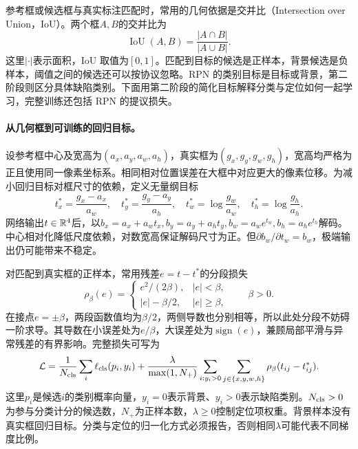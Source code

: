 参考框或候选框与真实标注匹配时，常用的几何依据是交并比（Intersection over Union，IoU）。两个框$A,B$的交并比为
\begin{equation}
 \operatorname{IoU}(A,B)=\frac{|A\cap B|}{|A\cup B|}.
\end{equation}
这里$|\cdot|$表示面积，IoU 取值为$[0,1]$。匹配到目标的候选是正样本，背景候选是负样本，阈值之间的候选还可以按协议忽略。RPN 的类别目标是目标或背景，第二阶段则区分具体缺陷类别。下面用第二阶段的简化目标解释分类与定位如何一起学习，完整训练还包括 RPN 的提议损失。

\paragraph{从几何框到可训练的回归目标。}
设参考框中心及宽高为$(a_x,a_y,a_w,a_h)$，真实框为$(g_x,g_y,g_w,g_h)$，宽高均严格为正且使用同一像素坐标系。相同相对位置误差在大框中对应更大的像素位移。为减小回归目标对框尺寸的依赖，定义无量纲目标
\begin{equation}
 t_x^*=\frac{g_x-a_x}{a_w},\quad t_y^*=\frac{g_y-a_y}{a_h},\quad
 t_w^*=\log\frac{g_w}{a_w},\quad t_h^*=\log\frac{g_h}{a_h}.
\end{equation}
网络输出$t\in\mathbb{R}^4$后，以$b_x=a_x+a_wt_x,b_y=a_y+a_ht_y,b_w=a_we^{t_w},b_h=a_he^{t_h}$解码。中心相对化降低尺度依赖，对数宽高保证解码尺寸为正。但$\partial b_w/\partial t_w=b_w$，极端输出仍可能带来不稳定。

对匹配到真实框的正样本，常用残差$e=t-t^*$的分段损失
\begin{equation}
 \rho_\beta(e)=\begin{cases}e^2/(2\beta),&|e|<\beta,\\|e|-\beta/2,&|e|\geq\beta,\end{cases}
 \qquad \beta>0.
\end{equation}
在接点$e=\pm\beta$，两段函数值均为$\beta/2$，两侧导数也分别相等，所以此处分段不妨碍一阶求导。其导数在小误差处为$e/\beta$，大误差处为$\operatorname{sign}(e)$，兼顾局部平滑与异常残差的有界影响。完整损失可写为
\begin{equation}
 \mathcal L=\frac1{N_{\rm cls}}\sum_i\ell_{\rm cls}(p_i,y_i)
 +\frac{\lambda}{\max(1,N_+)}\sum_{i:y_i>0}\sum_{j\in\{x,y,w,h\}}\rho_\beta(t_{ij}-t_{ij}^*).
\end{equation}
这里$p_i$是候选$i$的类别概率向量，$y_i=0$表示背景、$y_i>0$表示缺陷类别。$N_{\rm cls}>0$为参与分类计分的候选数，$N_+$为正样本数，$\lambda\geq0$控制定位项权重。背景样本没有真实框回归目标。分类与定位的归一化方式必须报告，否则相同$\lambda$可能代表不同梯度比例。

